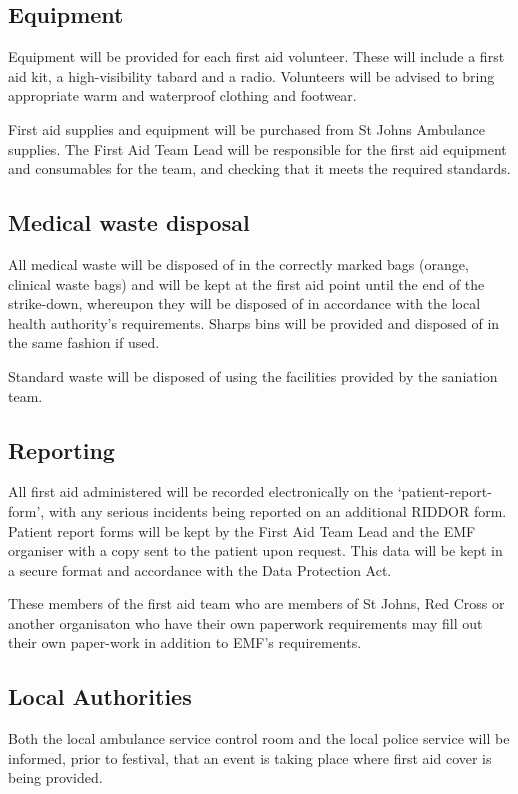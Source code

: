 \subsection{Equipment}
Equipment will be provided for each first aid volunteer. These will include a
first aid kit, a high-visibility tabard and a radio. Volunteers will be advised
to bring appropriate warm and waterproof clothing and footwear.

First aid supplies and equipment will be purchased from St Johns Ambulance
supplies. The First Aid Team Lead will be responsible for the first aid
equipment and consumables for the team, and checking that it meets the required
standards.

\subsection{Medical waste disposal}
All medical waste will be disposed of in the correctly marked bags (orange,
clinical waste bags) and will be kept at the first aid point until the end of
the strike-down, whereupon they will be disposed of in accordance with the
local health authority's requirements. Sharps bins will be provided and
disposed of in the same fashion if used.

Standard waste will be disposed of using the facilities provided by the saniation team.

\subsection{Reporting}
All first aid administered will be recorded electronically on the
‘patient-report-form', with any serious incidents being reported on an
additional RIDDOR form. Patient report forms will be kept by the First Aid Team
Lead and the EMF organiser with a copy sent to the patient upon request. This
data will be kept in a secure format and accordance with the Data Protection
Act.

These members of the first aid team who are members of St Johns, Red Cross or another organisaton who have their own paperwork requirements may fill out their own paper-work in addition to EMF's requirements.

\subsection{Local Authorities}
Both the local ambulance service control room and the local police service will
be informed, prior to festival, that an event is taking place where first aid
cover is being provided.

